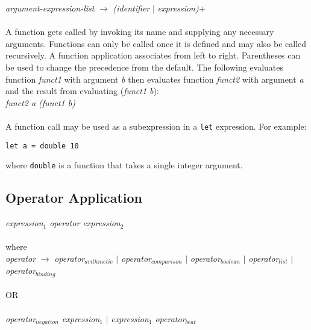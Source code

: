     \emph{argument-expression-list} $\rightarrow$ \emph{(identifier} $|$ \emph{expression)}$+$ \\ \\ 
    A function gets called by invoking its name and supplying any necessary arguments. Functions can only be called once it is defined and may also be called recursively. A function application associates from left to right. Parentheses can be used to change the precedence from the default. The following evaluates function \emph{funct1} with argument \emph{b} then 
    evaluates function \emph{funct2} with argument \emph{a} and the result from evaluating (\emph{funct1 b}): \\
    
    \emph{funct2 a (funct1 b)}\\ \\
A function call may be used as a subexpression in a \texttt{let} expression. For example:
\begin{verbatim}
let a = double 10
\end{verbatim}
where \texttt{double} is a function that takes a single integer argument. 

\subsection{Operator Application}
    \emph{expression$_{1}$  operator  expression$_{2}$}\\ \\
    where\\
    
    \emph{operator} $\rightarrow$ 
        \emph{operator$_{arithmetic}$} $|$
        \emph{operator$_{comparison}$}  $|$ 
        \emph{operator$_{boolean}$}  $|$
        \emph{operator$_{list}$}  $|$
        \emph{operator$_{binding}$} \\ \\
OR\\ \\
          \emph{operator$_{negation}$  expression$_{1}$} $|$
					\emph{expression$_{1}$ operator$_{beat}$}\\ \\
    
